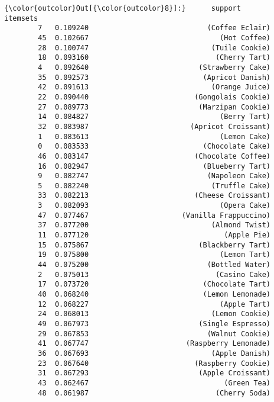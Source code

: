 \documentclass[11pt]{article}
\begin{document}
\begin{Verbatim}[commandchars=\\\{\}]
{\color{outcolor}Out[{\color{outcolor}8}]:}      support                                   itemsets
        7   0.109240                            (Coffee Eclair)
        45  0.102667                               (Hot Coffee)
        28  0.100747                             (Tuile Cookie)
        18  0.093160                              (Cherry Tart)
        4   0.092640                          (Strawberry Cake)
        35  0.092573                           (Apricot Danish)
        42  0.091613                             (Orange Juice)
        22  0.090440                         (Gongolais Cookie)
        27  0.089773                          (Marzipan Cookie)
        14  0.084827                               (Berry Tart)
        32  0.083987                        (Apricot Croissant)
        1   0.083613                               (Lemon Cake)
        0   0.083533                           (Chocolate Cake)
        46  0.083147                         (Chocolate Coffee)
        16  0.082947                           (Blueberry Tart)
        9   0.082747                            (Napoleon Cake)
        5   0.082240                             (Truffle Cake)
        33  0.082213                         (Cheese Croissant)
        3   0.082093                               (Opera Cake)
        47  0.077467                      (Vanilla Frappuccino)
        37  0.077200                             (Almond Twist)
        11  0.077120                                (Apple Pie)
        15  0.075867                          (Blackberry Tart)
        19  0.075800                               (Lemon Tart)
        44  0.075200                            (Bottled Water)
        2   0.075013                              (Casino Cake)
        17  0.073720                           (Chocolate Tart)
        40  0.068240                           (Lemon Lemonade)
        12  0.068227                               (Apple Tart)
        24  0.068013                             (Lemon Cookie)
        49  0.067973                          (Single Espresso)
        29  0.067853                            (Walnut Cookie)
        41  0.067747                       (Raspberry Lemonade)
        36  0.067693                             (Apple Danish)
        23  0.067640                         (Raspberry Cookie)
        31  0.067293                          (Apple Croissant)
        43  0.062467                                (Green Tea)
        48  0.061987                              (Cherry Soda)

\end{Verbatim}
\end{document}
